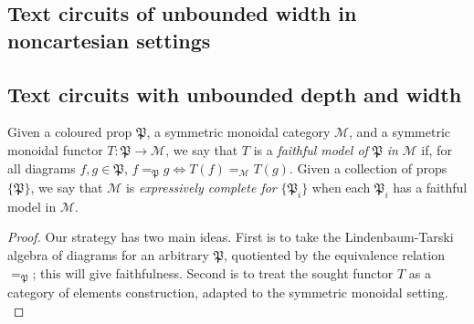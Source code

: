 \begin{fullwidth}
\subsection{Text circuits of unbounded width in noncartesian settings}

\subsection{Text circuits with unbounded depth and width}

\begin{defn}
Given a coloured prop $\mathfrak{P}$, a symmetric monoidal category $\mathcal{M}$, and a symmetric monoidal functor $T: \mathfrak{P} \rightarrow \mathcal{M}$, we say that $T$ is a \emph{faithful model of} $\mathfrak{P}$ \emph{in} $\mathcal{M}$ if, for all diagrams $f,g \in \mathfrak{P}$, $f =_\mathfrak{P} g \iff T(f) =_\mathcal{M} T(g)$. Given a collection of props $\{\mathfrak{P}\}$, we say that $\mathcal{M}$ is \emph{expressively complete for} $\{\mathfrak{P}_i\}$ when each $\mathfrak{P}_i$ has a faithful model in $\mathcal{M}$.
\end{defn}

\begin{theorem}
\begin{proof}
Our strategy has two main ideas. First is to take the Lindenbaum-Tarski algebra of diagrams for an arbitrary $\mathfrak{P}$, quotiented by the equivalence relation $=_\mathfrak{P}$; this will give faithfulness. Second is to treat the sought functor $T$ as a category of elements construction, adapted to the symmetric monoidal setting.\\


\end{proof}
\end{theorem}
\end{fullwidth}

